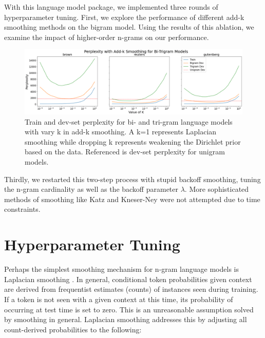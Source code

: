 \documentclass[11pt,a4paper]{article}
\begin{document}
With this language model package, we implemented three rounds of hyperparameter tuning. First,
we explore the performance of different add-k smoothing methods on the bigram model. Using the results
of this ablation, we examine the impact of higher-order n-grams on our performance.
\FloatBarrier
\begin{figure}[htpb]
  \centering
  \includegraphics[width=1\linewidth]{imgs/smooth_all.png}
  \caption{Train and dev-set perplexity for bi- and tri-gram 
  language models with vary k in add-k smoothing. A k=1 represents
Laplacian smoothing while dropping k represents weakening the Dirichlet 
prior based on the data. Referenced is dev-set perplexity for unigram models.}
  \label{fig:imgs/smooth_all}
  \vspace{-15pt}
\end{figure}
\FloatBarrier

Thirdly, we restarted this two-step process with stupid backoff smoothing, tuning the n-gram cardinality as well as the
backoff parameter $\lambda$. More sophisticated methods of smoothing like Katz \cite{katz1987estimation}
and Kneser-Ney \cite{kneser1995improved} were not attempted due to time constraints.

\section{Hyperparameter Tuning}%
\label{sec:hyperparam_tuning}

Perhaps the simplest smoothing mechanism for n-gram language models is Laplacian smoothing \cite{mackay1995hierarchical}.
In general, conditional token probabilities given context are derived from frequentist estimates (counts) of instances seen
during training. If a token is not seen with a given context at this time, its probability of occurring at test time is set to zero. 
This is an unreasonable assumption solved by smoothing in general. Laplacian smoothing addresses this by adjusting all count-derived
probabilities to the following:
\end{document}
